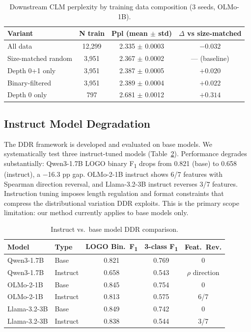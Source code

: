 \documentclass[11pt,a4paper]{article}
\newcommand{\fone}{F\textsubscript{1}}
\newcommand{\rhosp}{\rho}
\begin{document}
\begin{table}[t]
\centering
\caption{Downstream CLM perplexity by training data composition (3 seeds, OLMo-1B).}
\label{tab:downstream}
\begin{tabular}{lccc}
\toprule
\textbf{Variant} & \textbf{N train} & \textbf{Ppl (mean $\pm$ std)} & \textbf{$\Delta$ vs size-matched} \\
\midrule
All data & 12,299 & 2.335 $\pm$ 0.0003 & $-0.032$ \\
Size-matched random & 3,951 & 2.367 $\pm$ 0.0002 & --- (baseline) \\
Depth 0+1 only & 3,951 & 2.387 $\pm$ 0.0005 & $+0.020$ \\
Binary-filtered & 3,951 & 2.389 $\pm$ 0.0004 & $+0.022$ \\
Depth 0 only & 797 & 2.681 $\pm$ 0.0012 & $+0.314$ \\
\bottomrule
\end{tabular}
\end{table}

\subsection{Instruct Model Degradation}
\label{sec:instruct}

The DDR framework is developed and evaluated on base models.
We systematically test three instruct-tuned models (Table~\ref{tab:instruct}).
Performance degrades substantially: Qwen3-1.7B LOGO binary \fone{} drops from 0.821 (base) to 0.658 (instruct), a $-$16.3 pp gap.
OLMo-2-1B instruct shows 6/7 features with Spearman direction reversal,
and Llama-3.2-3B instruct reverses 3/7 features.
Instruction tuning imposes length regulation and format constraints that compress the distributional variation DDR exploits.
This is the primary scope limitation: our method currently applies to base models only.

\begin{table}[t]
\centering
\caption{Instruct vs.\ base model DDR comparison.}
\label{tab:instruct}
\begin{tabular}{llccc}
\toprule
\textbf{Model} & \textbf{Type} & \textbf{LOGO Bin.\ \fone{}} & \textbf{3-class \fone{}} & \textbf{Feat.\ Rev.} \\
\midrule
Qwen3-1.7B & Base & 0.821 & 0.769 & 0 \\
Qwen3-1.7B & Instruct & 0.658 & 0.543 & $\rhosp$ direction \\
OLMo-2-1B & Base & 0.845 & 0.754 & 0 \\
OLMo-2-1B & Instruct & 0.813 & 0.575 & 6/7 \\
Llama-3.2-3B & Base & 0.849 & 0.742 & 0 \\
Llama-3.2-3B & Instruct & 0.838 & 0.544 & 3/7 \\
\bottomrule
\end{tabular}
\end{table}
\end{document}
